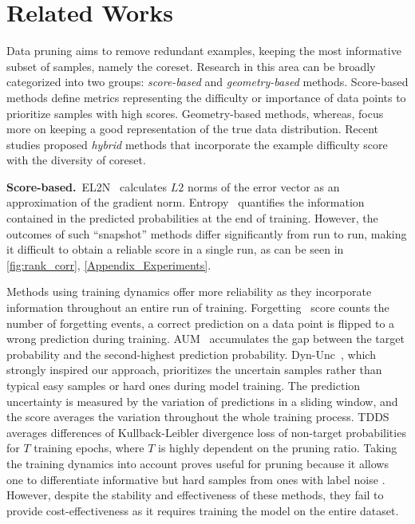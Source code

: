 \section{Related Works}
Data pruning aims to remove redundant examples, keeping the most informative subset of samples, namely the coreset.
Research in this area can be broadly categorized into two groups: \textit{score-based} and \textit{geometry-based} methods. Score-based methods define metrics representing the difficulty or importance of data points to prioritize samples with high scores. Geometry-based methods, whereas, focus more on keeping a good representation of the true data distribution.
Recent studies proposed \textit{hybrid} methods that incorporate the example difficulty score with the diversity of coreset.

\noindent\textbf{Score-based.}~EL2N~\citep{gordon2021data} calculates $L2$ norms of the error vector as an approximation of the gradient norm.
Entropy~\citep{coleman2020selectionproxyefficientdata} quantifies the information contained in the predicted probabilities at the end of training. However, the outcomes of such ``snapshot'' methods differ significantly from run to run, making it difficult to obtain a reliable score in a single run, as can be seen in \cref{fig:rank_corr}, \cref{Appendix_Experiments}.

Methods using training dynamics offer more reliability as they incorporate information throughout an entire run of training. Forgetting~\citep{toneva2018empirical} score counts the number of forgetting events, a correct prediction on a data point is flipped to a wrong prediction during training. AUM~\citep{pleiss2020identifyingmislabeleddatausing} accumulates the gap between the target probability and the second-highest prediction probability. 
Dyn-Unc~\citep{he2024large}, which strongly inspired our approach, prioritizes the uncertain samples rather than typical easy samples or hard ones during model training. The prediction uncertainty is measured by the variation of predictions in a sliding window, and the score averages the variation throughout the whole training process.
TDDS~\citep{zhang2024spanning} averages differences of Kullback-Leibler divergence loss of non-target probabilities for $T$ training epochs, where $T$ is highly dependent on the pruning ratio.
Taking the training dynamics into account proves useful for pruning because it allows one to differentiate informative but hard samples from ones with label noise \citep{he2024large}. However, despite the stability and effectiveness of these methods, they fail to provide cost-effectiveness as it requires training the model on the entire dataset.

